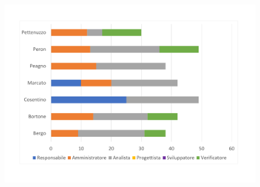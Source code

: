 	\begin{figure}[h]
	\centering
	\includegraphics[scale=0.45]{images/consuntivoRR.pdf}
	\caption{}
\end{figure}
